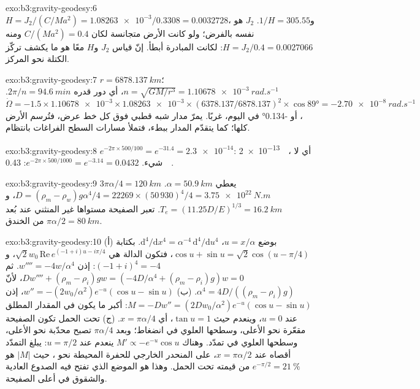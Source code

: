 \begin{solution}{exo:b3:gravity-geodesy:6}
$H = J_2/(C/Ma^2) = \num{1.08263e-3}/0.3308 = \num{0.0032728}$،
و$1/H = 305.55$. $J_2$ هو نفسه بالفرض؛ ولو كانت الأرض متجانسة لكان
$C/(Ma^2) = 0.4$ ومنه $H = J_2/0.4 = \num{0.0027066}$: لكانت المبادرة
أبطأ. إنّ قياس $J_2$ و$H$ معًا هو ما يكشف تركّز الكتلة
نحو المركز.
\end{solution}

\begin{solution}{exo:b3:gravity-geodesy:7}
$r = \qty{6878.137}{km}$؛ $n = \sqrt{GM/r^3} = \qty{1.10678e-3}{rad.s^{-1}}$، أي
دور قدره $2\pi/n = \qty{94.6}{min}$. $\dot\Omega = -1.5\times\num{1.10678e-3}
\times\num{1.08263e-3}\times(6378.137/6878.137)^2\times\cos\ang{89} =
\qty{-2.70e-8}{rad.s^{-1}}$، أو \ang{-0.134} في اليوم، غربًا. يمرّ مدار شبه قطبي
فوق كل خط عرض، فتُرسم الأرض كلها؛ كما يتقدّم المدار
ببطء، فتملأ مسارات السطح الفراغات بانتظام.
\end{solution}

\begin{solution}{exo:b3:gravity-geodesy:8}
$e^{-2\pi\times500/100} = e^{-31.4} = \num{2.3e-14}$: \qty{2e-13}{\milli\gal}، أي لا شيء.
$e^{-2\pi\times500/1000} = e^{-3.14} = 0.0432$:
\qty{0.43}{\milli\gal}.
\end{solution}

\begin{solution}{exo:b3:gravity-geodesy:9}
$3\pi\alpha/4 = \qty{120}{km}$ يعطي $\alpha = \qty{50.9}{km}$.
$D = (\rho_m - \rho_w)g\alpha^4/4 = 22269\times(50\,930)^4/4 =
\qty{3.75e22}{N.m}$، و$T_e = (11.25D/E)^{1/3} = \qty{16.2}{km}$. تعبر الصفيحة
مستواها غير المنثني عند بُعد $\pi\alpha/2 = \qty{80}{km}$ من الخندق.
\end{solution}

\begin{solution}{exo:b3:gravity-geodesy:10}
(أ) بوضع $u = x/\alpha$، $\mathrm d^4/\mathrm dx^4 = \alpha^{-4}\,\mathrm
d^4/\mathrm du^4$. بكتابة $\cos u + \sin u = \sqrt2\cos(u - \pi/4)$، فتكون الدالة
هي $\sqrt2w_0\,\mathrm{Re}\,e^{(-1 + i)u - i\pi/4}$،
و$(-1 + i)^4 = -4$: إذن $w'''' = -4w/\alpha^4$. ثم $Dw'''' + (\rho_m -
\rho_i)gw = (-4D/\alpha^4 + (\rho_m - \rho_i)g)w = 0$، لأنّ $\alpha^4 =
4D/((\rho_m - \rho_i)g)$. (ب) $w'' = -(2w_0/\alpha^2)e^{-u}(\cos u - \sin u)$، إذن
$M = -Dw'' = (2Dw_0/\alpha^2)e^{-u}(\cos u - \sin u)$: أكبر ما يكون في المقدار المطلق عند
$u = 0$، وينعدم حيث $\tan u = 1$، أي $x = \pi\alpha/4$. (ج) تحت الحمل
تكون الصفيحة مقعّرة نحو الأعلى، وسطحها العلوي في انضغاط؛ وبعد $\pi\alpha/4$
تصبح محدّبة نحو الأعلى، وسطحها العلوي في تمدّد. وهناك $M' \propto
-e^{-u}\cos u$ ينعدم عند $u = \pi/2$: يبلغ التمدّد أقصاه عند
$x = \pi\alpha/2$، على المنحدر الخارجي للحفرة المحيطة نحو ، حيث
$|M|$ هو $e^{-\pi/2} = \qty{21}{\percent}$ من قيمته تحت الحمل. وهذا هو
الموضع الذي تفتح فيه الصدوع العادية والشقوق في أعلى الصفيحة.
\end{solution}

